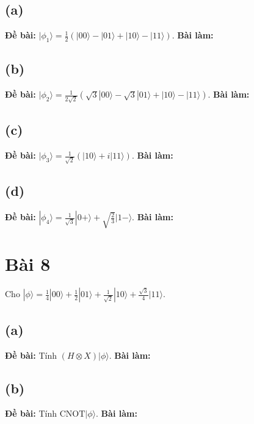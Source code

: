 \subsection{(a)}
\textbf{Đề bài:} $|\phi_{1}\rangle=\frac{1}{2}(|00\rangle-|01\rangle+|10\rangle-|11\rangle).$
\textbf{Bài làm:}

\subsection{(b)}
\textbf{Đề bài:} $|\phi_{2}\rangle=\frac{1}{2\sqrt{2}}(\sqrt{3}|00\rangle-\sqrt{3}|01\rangle+|10\rangle-|11\rangle)$.
\textbf{Bài làm:}

\subsection{(c)}
\textbf{Đề bài:} $|\phi_{3}\rangle=\frac{1}{\sqrt{2}}(|10\rangle+i|11\rangle)$.
\textbf{Bài làm:}

\subsection{(d)}
\textbf{Đề bài:} $|\phi_{4}\rangle=\frac{1}{\sqrt{3}}|0+\rangle+\sqrt{\frac{2}{3}}|1-\rangle$.
\textbf{Bài làm:}

\section{Bài 8}
Cho $|\phi\rangle=\frac{1}{4}|00\rangle+\frac{1}{2}|01\rangle+\frac{1}{\sqrt{2}}|10\rangle+\frac{\sqrt{3}}{4}|11\rangle$.

\subsection{(a)}
\textbf{Đề bài:} Tính $(H\otimes X)|\phi\rangle$.
\textbf{Bài làm:}

\subsection{(b)}
\textbf{Đề bài:} Tính $\mathrm{CNOT}|\phi\rangle$.
\textbf{Bài làm:}